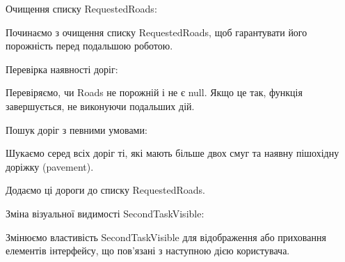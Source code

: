 \documentclass[14pt]{extarticle}
\begin{document}
\begin{fifthList}
    
    
\item Очищення списку RequestedRoads:
\begin{fifthList}
\item Починаємо з очищення списку RequestedRoads, щоб гарантувати його порожність перед подальшою роботою.
\end{fifthList}

\item Перевірка наявності доріг:
\begin{fifthList}
\item Перевіряємо, чи Roads не порожній і не є null. Якщо це так, функція завершується, не виконуючи подальших дій.
\end{fifthList}

\item Пошук доріг з певними умовами:
\begin{fifthList}
\item Шукаємо серед всіх доріг ті, які мають більше двох смуг та наявну пішохідну доріжку (pavement).
\item Додаємо ці дороги до списку RequestedRoads.
\end{fifthList}

\item Зміна візуальної видимості SecondTaskVisible:
\begin{fifthList}
\item Змінюємо властивість SecondTaskVisible для відображення або приховання елементів інтерфейсу, що пов'язані з наступною дією користувача.
\end{fifthList}

\end{fifthList}
\end{document}

